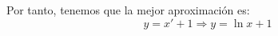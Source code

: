 \begin{ejercicio}
    Por tanto, tenemos que la mejor aproximación es:
    \begin{equation*}
        y = x' +1 \Longrightarrow y = \ln x +1
    \end{equation*}
    
\end{ejercicio}

